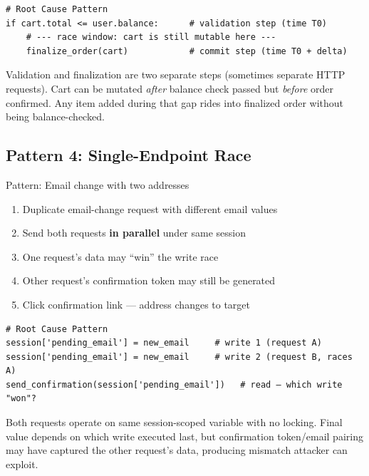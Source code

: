 \documentclass[11pt]{article}
\begin{document}
\begin{lstlisting}[style=code]
# Root Cause Pattern
if cart.total <= user.balance:      # validation step (time T0)
    # --- race window: cart is still mutable here ---
    finalize_order(cart)            # commit step (time T0 + delta)
\end{lstlisting}

\begin{causebox}
Validation and finalization are two separate steps (sometimes separate HTTP requests). Cart can be mutated \emph{after} balance check passed but \emph{before} order confirmed. Any item added during that gap rides into finalized order without being balance-checked.
\end{causebox}

\subsection{Pattern 4: Single-Endpoint Race}

\begin{labbox}{Pattern: Email change with two addresses}
\begin{enumerate}
    \item Duplicate email-change request with different email values
    \item Send both requests \textbf{in parallel} under same session
    \item One request's data may ``win'' the write race
    \item Other request's confirmation token may still be generated
    \item Click confirmation link — address changes to target
\end{enumerate}
\end{labbox}

\begin{lstlisting}[style=code]
# Root Cause Pattern
session['pending_email'] = new_email     # write 1 (request A)
session['pending_email'] = new_email     # write 2 (request B, races A)
send_confirmation(session['pending_email'])   # read — which write "won"?
\end{lstlisting}

\begin{causebox}
Both requests operate on same session-scoped variable with no locking. Final value depends on which write executed last, but confirmation token/email pairing may have captured the other request's data, producing mismatch attacker can exploit.
\end{causebox}
\end{document}
